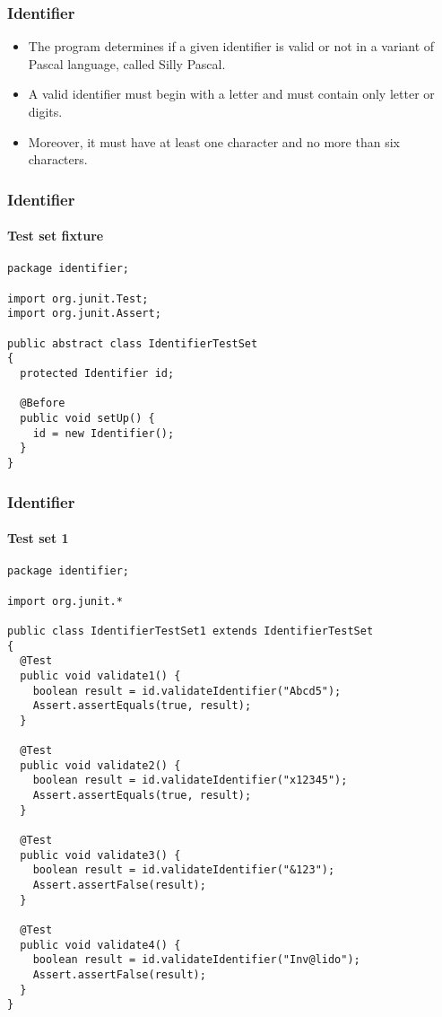 \begin{frame}[hasprev=false, hasnext=true]
\frametitle{Identifier}
\label{example:identifier-testcases-junit}

\begin{itemize}
	\item The program determines if a given identifier is valid or not in a
	variant of Pascal language, called Silly Pascal.

	\item A valid identifier must begin with a letter and must contain only
	letter or digits.

	\item Moreover, it must have at least one character and no more than six
	characters.
\end{itemize}
\end{frame}



\begin{frame}[fragile, hasprev=true, hasnext=true]
\frametitle{Identifier}
\framesubtitle{Test set fixture}


\begin{lstlisting}
package identifier;

import org.junit.Test;
import org.junit.Assert;

public abstract class IdentifierTestSet
{
  protected Identifier id;

  @Before
  public void setUp() {
    id = new Identifier();
  }
}
\end{lstlisting}
\end{frame}




\begin{frame}[fragile]
\frametitle{Identifier}
\framesubtitle{Test set 1}

\begin{lstlisting}
package identifier;

import org.junit.*

public class IdentifierTestSet1 extends IdentifierTestSet
{
  @Test
  public void validate1() {
    boolean result = id.validateIdentifier("Abcd5");
    Assert.assertEquals(true, result);
  }

  @Test
  public void validate2() {
    boolean result = id.validateIdentifier("x12345");
    Assert.assertEquals(true, result);
  }

  @Test
  public void validate3() {
    boolean result = id.validateIdentifier("&123");
    Assert.assertFalse(result);
  }

  @Test
  public void validate4() {
    boolean result = id.validateIdentifier("Inv@lido");
    Assert.assertFalse(result);
  }
}
\end{lstlisting}
\end{frame}


